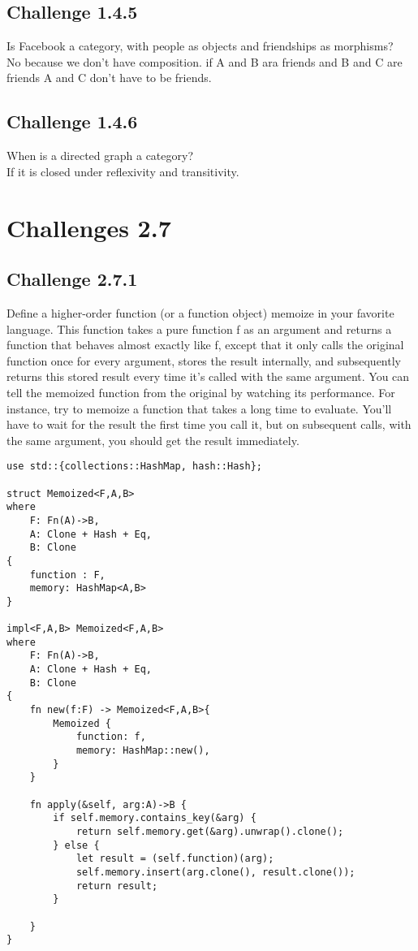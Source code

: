 \documentclass[11pt]{article}
\begin{document}
    \subsection*{Challenge 1.4.5}
    Is Facebook a category, with people as objects and friendships as
    morphisms?\\
    No because we don't have composition. if A and B ara friends and B and C are friends A and C don't have to be friends. 

    \subsection*{Challenge 1.4.6}
    When is a directed graph a category?\\
    If it is closed under reflexivity and transitivity.

    \section*{Challenges 2.7}
    \subsection*{Challenge 2.7.1}
    Define a higher-order function (or a function object) memoize in
    your favorite language. This function takes a pure function f as
    an argument and returns a function that behaves almost exactly
    like f, except that it only calls the original function once for every
    argument, stores the result internally, and subsequently returns
    this stored result every time it’s called with the same argument.
    You can tell the memoized function from the original by watching
    its performance. For instance, try to memoize a function that
    takes a long time to evaluate. You’ll have to wait for the result
    the first time you call it, but on subsequent calls, with the same
    argument, you should get the result immediately. \\
    \begin{lstlisting}
use std::{collections::HashMap, hash::Hash};

struct Memoized<F,A,B>
where
    F: Fn(A)->B,
    A: Clone + Hash + Eq,
    B: Clone
{
    function : F,
    memory: HashMap<A,B>
}

impl<F,A,B> Memoized<F,A,B>
where
    F: Fn(A)->B,
    A: Clone + Hash + Eq,
    B: Clone
{
    fn new(f:F) -> Memoized<F,A,B>{
        Memoized {
            function: f,
            memory: HashMap::new(),
        }
    }

    fn apply(&self, arg:A)->B {
        if self.memory.contains_key(&arg) {
            return self.memory.get(&arg).unwrap().clone();
        } else {
            let result = (self.function)(arg);
            self.memory.insert(arg.clone(), result.clone());
            return result;
        }
    
    }
}
    \end{lstlisting}
\end{document}
